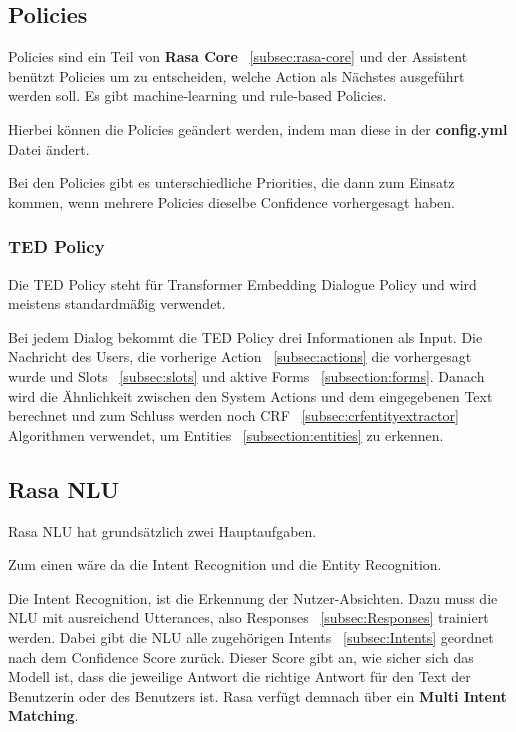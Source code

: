 \subsection{Policies}\label{subsec:policies}

Policies sind ein Teil von \textbf{Rasa Core} ~\ref{subsec:rasa-core} und der Assistent benützt Policies um zu entscheiden, welche Action als Nächstes ausgeführt werden soll.
Es gibt machine-learning und rule-based Policies.\cite{policies}

Hierbei können die Policies geändert werden, indem man diese in der \textbf{config.yml} Datei ändert.

Bei den Policies gibt es unterschiedliche Priorities, die dann zum Einsatz kommen, wenn mehrere Policies dieselbe Confidence vorhergesagt haben.\cite{policyPriority}

\subsubsection{TED Policy}

Die TED Policy steht für Transformer Embedding Dialogue Policy und wird meistens standardmäßig verwendet.\cite{tedPolicy}

Bei jedem Dialog bekommt die TED Policy drei Informationen als Input.
Die Nachricht des Users, die vorherige Action ~\ref{subsec:actions} die vorhergesagt wurde und Slots ~\ref{subsec:slots} und aktive Forms ~\ref{subsection:forms}.
Danach wird die Ähnlichkeit zwischen den System Actions und dem eingegebenen Text berechnet und zum Schluss werden noch CRF ~\ref{subsec:crfentityextractor} Algorithmen verwendet, um Entities ~\ref{subsection:entities} zu erkennen.\cite{tedPolicy}

\subsection{Rasa NLU}\label{subsec:rasa-nlu}

Rasa NLU hat grundsätzlich zwei Hauptaufgaben.

Zum einen wäre da die Intent Recognition und die Entity Recognition.\cite{rasanlu, pretrainedVsSupervised}

Die Intent Recognition, ist die Erkennung der Nutzer-Absichten.
Dazu muss die NLU mit ausreichend Utterances, also Responses ~\ref{subsec:Responses} trainiert werden.
Dabei gibt die NLU alle zugehörigen Intents ~\ref{subsec:Intents} geordnet nach dem Confidence Score zurück.
Dieser Score gibt an, wie sicher sich das Modell ist, dass die jeweilige Antwort die richtige Antwort für den Text der Benutzerin oder des Benutzers ist.
Rasa verfügt demnach über ein \textbf{Multi Intent Matching}.\cite{rasanlu, pretrainedVsSupervised}

